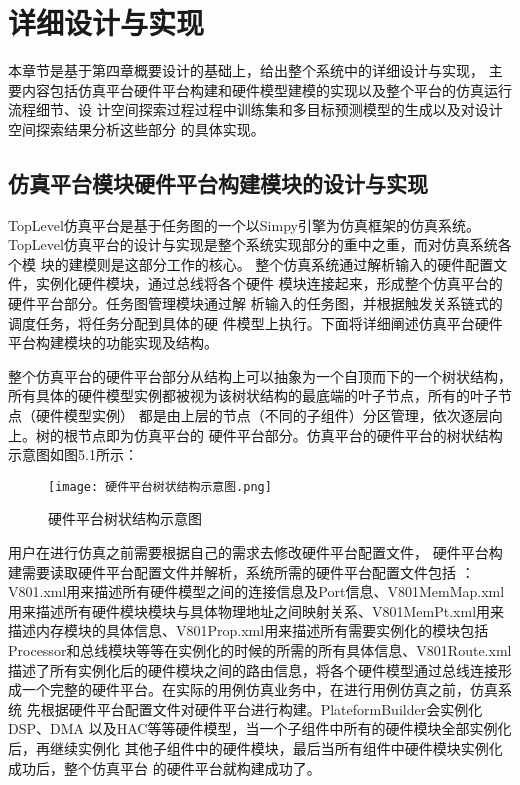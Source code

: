 
\chapter{详细设计与实现}
本章节是基于第四章概要设计的基础上，给出整个系统中的详细设计与实现，
主要内容包括仿真平台硬件平台构建和硬件模型建模的实现以及整个平台的仿真运行流程细节、设
计空间探索过程过程中训练集和多目标预测模型的生成以及对设计空间探索结果分析这些部分
的具体实现。

\section{仿真平台模块硬件平台构建模块的设计与实现}
TopLevel仿真平台是基于任务图的一个以Simpy引擎为仿真框架的仿真系统\cite{36}。
TopLevel仿真平台的设计与实现是整个系统实现部分的重中之重，而对仿真系统各个模
块的建模则是这部分工作的核心。
整个仿真系统通过解析输入的硬件配置文件，实例化硬件模块，通过总线将各个硬件
模块连接起来，形成整个仿真平台的硬件平台部分。任务图管理模块通过解
析输入的任务图，并根据触发关系链式的调度任务，将任务分配到具体的硬
件模型上执行。下面将详细阐述仿真平台硬件平台构建模块的功能实现及结构。

整个仿真平台的硬件平台部分从结构上可以抽象为一个自顶而下的一个树状结构，
所有具体的硬件模型实例都被视为该树状结构的最底端的叶子节点，所有的叶子节点（硬件模型实例）
都是由上层的节点（不同的子组件）分区管理，依次逐层向上。树的根节点即为仿真平台的
硬件平台部分。仿真平台的硬件平台的树状结构示意图如图5.1所示：

\begin{figure}
    \centering
    \texttt{[image: 硬件平台树状结构示意图.png]}
    \caption{硬件平台树状结构示意图}
    \label{fig:badge}
\end{figure}

用户在进行仿真之前需要根据自己的需求去修改硬件平台配置文件，
硬件平台构建需要读取硬件平台配置文件并解析，系统所需的硬件平台配置文件包括
：V801.xml用来描述所有硬件模型之间的连接信息及Port信息、V801MemMap.xml
用来描述所有硬件模块模块与具体物理地址之间映射关系、V801MemPt.xml用来
描述内存模块的具体信息、V801Prop.xml用来描述所有需要实例化的模块包括
Processor和总线模块等等在实例化的时候的所需的所有具体信息、V801Route.xml
描述了所有实例化后的硬件模块之间的路由信息，将各个硬件模型通过总线连接形
成一个完整的硬件平台。在实际的用例仿真业务中，在进行用例仿真之前，仿真系统
先根据硬件平台配置文件对硬件平台进行构建。PlateformBuilder会实例化DSP、DMA
以及HAC等等硬件模型，当一个子组件中所有的硬件模块全部实例化后，再继续实例化
其他子组件中的硬件模块，最后当所有组件中硬件模块实例化成功后，整个仿真平台
的硬件平台就构建成功了。

